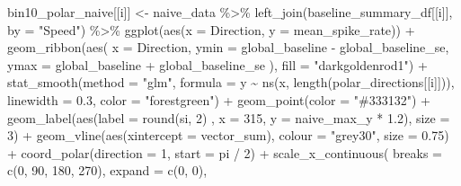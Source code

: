 \documentclass[
]{book}
\newenvironment{Shaded}{\begin{snugshade}}{\end{snugshade}}
\newcommand{\AttributeTok}[1]{\textcolor[rgb]{0.77,0.63,0.00}{#1}}
\newcommand{\DecValTok}[1]{\textcolor[rgb]{0.00,0.00,0.81}{#1}}
\newcommand{\FloatTok}[1]{\textcolor[rgb]{0.00,0.00,0.81}{#1}}
\newcommand{\FunctionTok}[1]{\textcolor[rgb]{0.00,0.00,0.00}{#1}}
\newcommand{\NormalTok}[1]{#1}
\newcommand{\OtherTok}[1]{\textcolor[rgb]{0.56,0.35,0.01}{#1}}
\newcommand{\SpecialCharTok}[1]{\textcolor[rgb]{0.00,0.00,0.00}{#1}}
\newcommand{\StringTok}[1]{\textcolor[rgb]{0.31,0.60,0.02}{#1}}
\begin{document}
\begin{Shaded}
\begin{Highlighting}[]
\NormalTok{  bin10\_polar\_naive[[i]] }\OtherTok{\textless{}{-}}
\NormalTok{    naive\_data }\SpecialCharTok{\%\textgreater{}\%}
    \FunctionTok{left\_join}\NormalTok{(baseline\_summary\_df[[i]], }\AttributeTok{by =} \StringTok{"Speed"}\NormalTok{) }\SpecialCharTok{\%\textgreater{}\%}
    \FunctionTok{ggplot}\NormalTok{(}\FunctionTok{aes}\NormalTok{(}\AttributeTok{x =}\NormalTok{ Direction, }\AttributeTok{y =}\NormalTok{ mean\_spike\_rate)) }\SpecialCharTok{+}
    \FunctionTok{geom\_ribbon}\NormalTok{(}\FunctionTok{aes}\NormalTok{(}
      \AttributeTok{x =}\NormalTok{ Direction,}
      \AttributeTok{ymin =}\NormalTok{ global\_baseline }\SpecialCharTok{{-}}\NormalTok{ global\_baseline\_se,}
      \AttributeTok{ymax =}\NormalTok{ global\_baseline }\SpecialCharTok{+}\NormalTok{ global\_baseline\_se}
\NormalTok{    ),}
    \AttributeTok{fill =} \StringTok{"darkgoldenrod1"}\NormalTok{) }\SpecialCharTok{+}
    \FunctionTok{stat\_smooth}\NormalTok{(}\AttributeTok{method =} \StringTok{"glm"}\NormalTok{,}
                \AttributeTok{formula =}\NormalTok{ y }\SpecialCharTok{\textasciitilde{}} \FunctionTok{ns}\NormalTok{(x, }\FunctionTok{length}\NormalTok{(polar\_directions[[i]])),}
                \AttributeTok{linewidth =} \FloatTok{0.3}\NormalTok{, }\AttributeTok{color =} \StringTok{"forestgreen"}\NormalTok{) }\SpecialCharTok{+}
    \FunctionTok{geom\_point}\NormalTok{(}\AttributeTok{color =} \StringTok{"\#333132"}\NormalTok{) }\SpecialCharTok{+}
    \FunctionTok{geom\_label}\NormalTok{(}\FunctionTok{aes}\NormalTok{(}\AttributeTok{label =} \FunctionTok{round}\NormalTok{(si, }\DecValTok{2}\NormalTok{) , }\AttributeTok{x =} \DecValTok{315}\NormalTok{, }\AttributeTok{y =}\NormalTok{ naive\_max\_y }\SpecialCharTok{*} \FloatTok{1.2}\NormalTok{),}
               \AttributeTok{size =} \DecValTok{3}\NormalTok{) }\SpecialCharTok{+}
    \FunctionTok{geom\_vline}\NormalTok{(}\FunctionTok{aes}\NormalTok{(}\AttributeTok{xintercept =}\NormalTok{ vector\_sum), }\AttributeTok{colour =} \StringTok{"grey30"}\NormalTok{,}
               \AttributeTok{size =} \FloatTok{0.75}\NormalTok{) }\SpecialCharTok{+}
    \FunctionTok{coord\_polar}\NormalTok{(}\AttributeTok{direction =} \DecValTok{1}\NormalTok{, }\AttributeTok{start =}\NormalTok{ pi }\SpecialCharTok{/} \DecValTok{2}\NormalTok{) }\SpecialCharTok{+}
    \FunctionTok{scale\_x\_continuous}\NormalTok{(}
      \AttributeTok{breaks =} \FunctionTok{c}\NormalTok{(}\DecValTok{0}\NormalTok{, }\DecValTok{90}\NormalTok{, }\DecValTok{180}\NormalTok{, }\DecValTok{270}\NormalTok{),}
      \AttributeTok{expand =} \FunctionTok{c}\NormalTok{(}\DecValTok{0}\NormalTok{, }\DecValTok{0}\NormalTok{),}

\end{Highlighting}
\end{Shaded}
\end{document}
